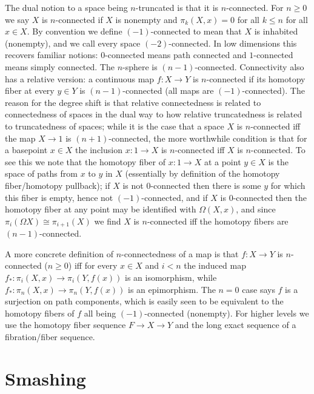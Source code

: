 The dual notion to a space being \(n\)-truncated is that it is \(n\)-connected. For \(n \geq 0\) we say \(X\) is \(n\)-connected if \(X\) is nonempty and \(\pi_k(X, x) = 0\) for all \(k \leq n\) for all \(x \in X\). By convention we define \((-1)\)-connected to mean that \(X\) is inhabited (nonempty), and we call every space \((-2)\)-connected. In low dimensions this recovers familiar notions: \(0\)-connected means path connected and \(1\)-connected means simply connected. The \(n\)-sphere is \((n - 1)\)-connected. Connectivity also has a relative version: a continuous map \(f : X \to Y\) is \(n\)-connected if its homotopy fiber at every \(y \in Y\) is \((n - 1)\)-connected (all maps are \((-1)\)-connected). The reason for the degree shift is that relative connectedness is related to connectedness of spaces in the dual way to how relative truncatedness is related to truncatedness of spaces; while it is the case that a space \(X\) is \(n\)-connected iff the map \(X \to 1\) is \((n+1)\)-connected, the more worthwhile condition is that for a basepoint \(x \in X\) the inclusion \(x : 1 \to X\) is \(n\)-connected iff \(X\) is \(n\)-connected. To see this we note that the homotopy fiber of \(x : 1 \to X\) at a point \(y \in X\) is the space of paths from \(x\) to \(y\) in \(X\) (essentially by definition of the homotopy fiber/homotopy pullback); if \(X\) is not \(0\)-connected then there is some \(y\) for which this fiber is empty, hence not \((-1)\)-connected, and if \(X\) is \(0\)-connected then the homotopy fiber at any point may be identified with \(\Omega(X, x)\), and since \(\pi_i(\Omega X) \cong \pi_{i+1}(X)\) we find \(X\) is \(n\)-connected iff the homotopy fibers are \((n-1)\)-connected.

A more concrete definition of \(n\)-connectedness of a map is that \(f : X \to Y\) is \(n\)-connected (\(n \geq 0\)) iff for every \(x \in X\) and \(i < n\) the induced map \(f_* : \pi_i(X, x) \to \pi_i(Y, f(x))\) is an isomorphism, while \(f_* : \pi_n(X, x) \to \pi_n(Y, f(x))\) is an epimorphism. The \(n = 0\) case says \(f\) is a surjection on path components, which is easily seen to be equivalent to the homotopy fibers of \(f\) all being \((-1)\)-connected (nonempty). For higher levels we use the homotopy fiber sequence \(F \to X \to Y\) and the long exact sequence of a fibration/fiber sequence.

\section{Smashing}


